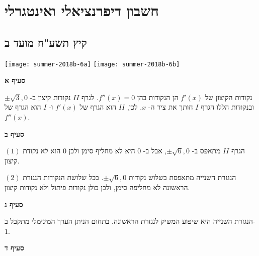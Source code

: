 


\chapter{חשבון דיפרנציאלי ואינטגרלי}


\section{קיץ תשע"ח מועד ב}

\begin{center}
\texttt{[image: summer-2018b-6a]}
\texttt{[image: summer-2018b-6b]}
\end{center}

\vspace{-4ex}

\textbf{סעיף א}

נקודות הקיצון של
$f'(x)$
הן הנקודות בהן 
$f''(x)=0$.
לגרף
$II$
נקודות קיצון ב-%
$\pm\sqrt{3},0$
ובנקודות הללו הגרף
$I$
חותך את ציר ה-%
$x$.
לכן, 
$II$
הוא הגרף של
$f'(x)$
ו-%
$I$
הוא הגרף של
$f''(x)$.

\textbf{סעיף ב}

$(1)$
הגרף 
$II$
מתאפס ב-%
$\pm\sqrt{6},0$,
אבל ב-%
$0$
היא לא מחליף סימן ולכן
$0$
הוא לא נקודת קיצון.

$(2)$
הנגזרת השנייה מתאפסת בשלוש נקודות
$\pm\sqrt{6},0$.
בכל שלושת הנקודות הנגזרת הראשונה לא מחליפה סימן, ולכן כולן נקודות פיתול ולא נקודות קיצון.

\np

\textbf{סעיף ג}

הנגזרת השנייה היא שיפוע המשיק לנגזרת הראשונה. בתחום הניתן הערך המינימלי מתקבל ב-%
$1$.


\textbf{סעיף ד}

